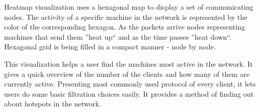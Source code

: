 Heatmap visualization uses a hexagonal map to display a set of communicating nodes.
The activity of a specific machine in the network is represented by the color of the 
corresponding hexagon. As the packets arrive nodes representing machines that send them
''heat up`` and as the time passes ''heat down``. Hexagonal grid is being filled in a 
compact manner - node by node.

This visualization helps a user find the machines most active in the network.
It gives a quick overview of the number of the clients and how many of them are currently active.
Presenting most commonly used protocol of every client, it lets users do some basic filtration choices easily.
It provides a method of finding out about hotspots in the network.
